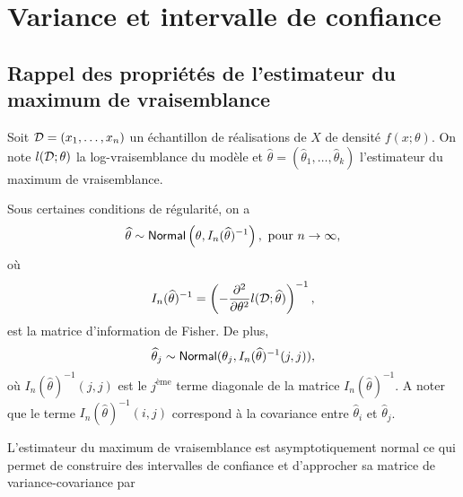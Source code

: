 \section{Variance et intervalle de confiance}
\subsection{Rappel des propriétés de l'estimateur du maximum de vraisemblance}
Soit $\mathcal{D} = (x_1,\ldots, x_n)$ un échantillon \iid de réalisations de $X$ \va de densité $f(x;\theta)$. On note $l(\mathcal{D} ; \theta)$ la log-vraisemblance du modèle et $\widehat{\theta} =(\widehat{\theta}_1,\ldots, \widehat{\theta}_k) $ l'estimateur du maximum de vraisemblance.
\begin{theo}
Sous certaines conditions de régularité, on a
$$
\widehat{\theta}\sim \mathsf{Normal}\left(\theta,I_n(\widehat{\theta})^{-1}\right),\text{ pour } n\rightarrow\infty,
$$
où 
$$
I_n(\widehat{\theta})^{-1} =  \left(-\frac{\partial^2}{\partial\theta^2}l(\mathcal{D};\widehat{\theta})\right)^{-1},
$$
est la matrice d'information de Fisher. De plus, 
$$
\widehat{\theta}_j\sim\mathsf{Normal}(\theta_j, I_n(\widehat{\theta})^{-1}(j,j)),
$$
où $I_n(\widehat{\theta})^{-1}(j,j)$ est le $j^{\text{ème}}$ terme diagonale de la matrice $I_n(\widehat{\theta})^{-1}$. A noter que le terme $I_n(\widehat{\theta})^{-1}(i,j)$ correspond à la covariance entre $\widehat{\theta}_i$ et $\widehat{\theta}_j$.
\end{theo}
L'estimateur du maximum de vraisemblance est asymptotiquement normal ce qui permet de construire des intervalles de confiance et d'approcher sa matrice de variance-covariance par
